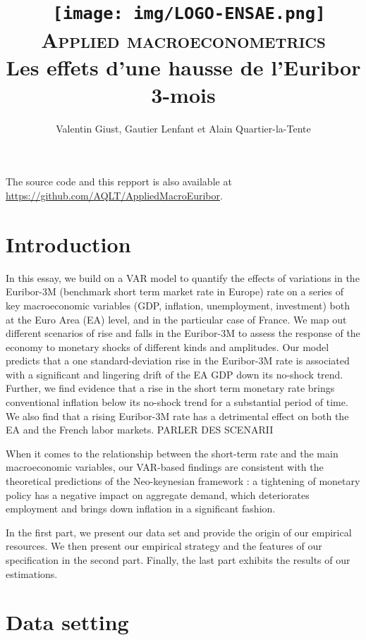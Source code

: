 \documentclass[
  10pt,
]{article}
\title{~\texttt{[image: img/LOGO-ENSAE.png]}\\
\hspace*{0.333em}\textsc{Applied macroeconometrics}\\
\hspace*{0.333em}Les effets d'une hausse de l'Euribor 3-mois}
\author{Valentin Giust, Gautier Lenfant et Alain Quartier-la-Tente}
\date{}
\begin{document}
\maketitle

{
\setcounter{tocdepth}{2}
\tableofcontents
}
\vfill

The source code and this repport is also available at \url{https://github.com/AQLT/AppliedMacroEuribor}.

\newpage

\hypertarget{introduction}{%
\section*{Introduction}\label{introduction}}

In this essay, we build on a VAR model to quantify the effects of variations in the Euribor-3M (benchmark short term market rate in Europe) rate on a series of key macroeconomic variables (GDP, inflation, unemployment, investment) both at the Euro Area (EA) level, and in the particular case of France. We map out different scenarios of rise and falls in the Euribor-3M to assess the response of the economy to monetary shocks of different kinds and amplitudes. Our model predicts that a one standard-deviation rise in the Euribor-3M rate is associated with a significant and lingering drift of the EA GDP down its no-shock trend. Further, we find evidence that a rise in the short term monetary rate brings conventional inflation below its no-shock trend for a substantial period of time. We also find that a rising Euribor-3M rate has a detrimental effect on both the EA and the French labor markets. PARLER DES SCENARII

When it comes to the relationship between the short-term rate and the main macroeconomic variables, our VAR-based findings are consistent with the theoretical predictions of the Neo-keynesian framework : a tightening of monetary policy has a negative impact on aggregate demand, which deteriorates employment and brings down inflation in a significant fashion.

In the first part, we present our data set and provide the origin of our empirical resources. We then present our empirical strategy and the features of our specification in the second part. Finally, the last part exhibits the results of our estimations.

\hypertarget{data-setting}{%
\section*{Data setting}\label{data-setting}}
\end{document}
